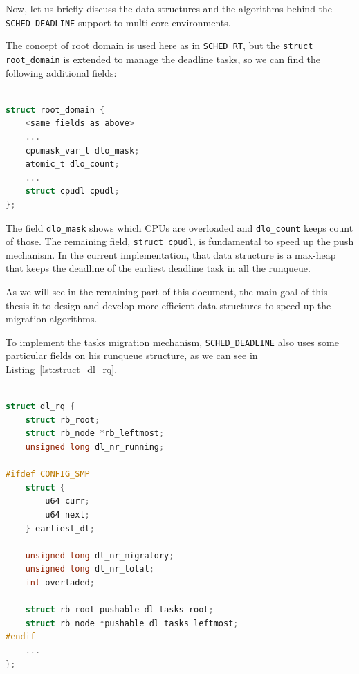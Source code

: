 Now, let us briefly discuss the data structures and the algorithms
behind the \texttt{SCHED\_DEADLINE} support to multi-core
environments.

The concept of root domain is used here as in \texttt{SCHED\_RT}, but
the \texttt{struct root\_domain} is extended to manage the deadline
tasks, so we can find the following additional fields:

\begin{lstlisting}[language=C, caption={\texttt{struct root\_domain extended}},
			label={lst:struct_root_domain_ext}]

struct root_domain {
	<same fields as above>
	...
	cpumask_var_t dlo_mask;
	atomic_t dlo_count;
	...
	struct cpudl cpudl;
};

\end{lstlisting}

The field \texttt{dlo\_mask} shows which CPUs are overloaded and
\texttt{dlo\_count} keeps count of those. The remaining field,
\texttt{struct cpudl}, is fundamental to speed up the push
mechanism. In the current implementation, that data structure is a
max-heap that keeps the deadline of the earliest deadline task in all
the runqueue.

As we will see in the remaining part of this document, the main goal
of this thesis it to design and develop more efficient data structures
to speed up the migration algorithms.

To implement the tasks migration mechanism, \texttt{SCHED\_DEADLINE}
also uses some particular fields on his runqueue structure, as we can
see in Listing~\ref{lst:struct_dl_rq}.

\begin{lstlisting}[language=C, caption={\texttt{struct dl\_rq}},
                        label={lst:struct_dl_rq}]

struct dl_rq {
	struct rb_root;
	struct rb_node *rb_leftmost;
	unsigned long dl_nr_running;

#ifdef CONFIG_SMP
	struct {
		u64 curr;
		u64 next;
	} earliest_dl;
	
	unsigned long dl_nr_migratory;
	unsigned long dl_nr_total;
	int overladed;

	struct rb_root pushable_dl_tasks_root;
	struct rb_node *pushable_dl_tasks_leftmost;
#endif
	...
};

\end{lstlisting}

